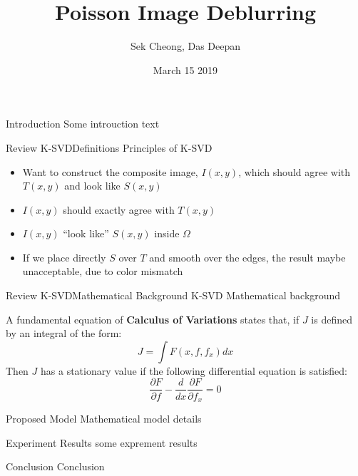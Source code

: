 \documentclass{beamer}
\title[Poisson Deblurring]{Poisson Image Deblurring}
\author{Sek Cheong, Das Deepan}
\institute{University of Wisconsin, Madison}
\date{March 15 2019}
\begin{document}
\begin{frame}
\titlepage
\end{frame}

\begin{frame}[t]{Introduction}
Some introuction text

\end{frame}

\begin{frame}[t]{Review K-SVD}{Definitions}
Principles of K-SVD 
    \begin{itemize}   
        \item Want to construct the composite image, $I(x,y)$, which should agree with $T(x,y)$ and look like $S(x,y)$    
        \item $I(x,y)$ should exactly agree with $T(x,y)$ 
        \item $I(x,y)$ ``look like'' $S(x,y)$ inside $\Omega$
        \item If we place directly $S$ over $T$ and smooth over the edges, the result maybe unacceptable, due to color mismatch
    \end{itemize}
\end{frame}

\begin{frame}[t]{Review K-SVD}{Mathematical Background}
K-SVD Mathematical background

A fundamental equation of {\bf Calculus of Variations} states that, if $J$ is defined by an integral of the form:
\[
    J= \int F(x,f, f_x)dx
\]
Then $J$ has a stationary value if the following differential equation is satisfied:
\[
    \frac{\partial F}{\partial f} - \frac{d}{dx}\frac{\partial F}{\partial f_x}=0
\]
\end{frame}

\begin{frame}[t]{Proposed Model}
Mathematical model details
\end{frame}

\begin{frame}[t]{Experiment Results}
some exprement results
\end{frame}

\begin{frame}[t]{Conclusion}
Conclusion
\end{frame}
\end{document}
